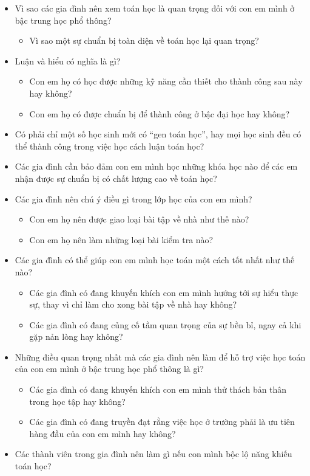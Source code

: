 \documentclass[
  10pt,
  a4paper,
  landscape,
  twoside,
  openany
]{scrbook}
\newcommand{\VI}[1]{#1}
\begin{document}
{
\VI{
  \begin{itemize}
    \item Vì sao các gia đình nên xem toán học là quan trọng đối với con em mình ở bậc trung học phổ thông?
      \begin{itemize}
        \item Vì sao một sự chuẩn bị toàn diện về toán học lại quan trọng?
      \end{itemize}
    \item Luận và hiểu có nghĩa là gì?
      \begin{itemize}
        \item Con em họ có học được những kỹ năng cần thiết cho thành công sau này hay không?
        \item Con em họ có được chuẩn bị để thành công ở bậc đại học hay không?
      \end{itemize}
    \item Có phải chỉ một số học sinh mới có ``gen toán học'', hay mọi học sinh đều có thể thành công trong việc học cách luận toán học?
    \item Các gia đình cần bảo đảm con em mình học những khóa học nào để các em nhận được sự chuẩn bị có chất lượng cao về toán học?
    \item Các gia đình nên chú ý điều gì trong lớp học của con em mình?
      \begin{itemize}
        \item Con em họ nên được giao loại bài tập về nhà như thế nào?
        \item Con em họ nên làm những loại bài kiểm tra nào?
      \end{itemize}
    \item Các gia đình có thể giúp con em mình học toán một cách tốt nhất như thế nào?
      \begin{itemize}
        \item Các gia đình có đang khuyến khích con em mình hướng tới sự hiểu thực sự, thay vì chỉ làm cho xong bài tập về nhà hay không?
        \item Các gia đình có đang củng cố tầm quan trọng của sự bền bỉ, ngay cả khi gặp nản lòng hay không?
      \end{itemize}
    \item Những điều quan trọng nhất mà các gia đình nên làm để hỗ trợ việc học toán của con em mình ở bậc trung học phổ thông là gì?
      \begin{itemize}
        \item Các gia đình có đang khuyến khích con em mình thử thách bản thân trong học tập hay không?
        \item Các gia đình có đang truyền đạt rằng việc học ở trường phải là ưu tiên hàng đầu của con em mình hay không?
      \end{itemize}
    \item Các thành viên trong gia đình nên làm gì nếu con mình bộc lộ năng khiếu toán học?
  \end{itemize}}
}
\end{document}
